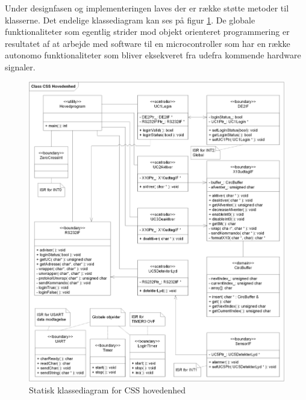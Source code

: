 Under designfasen og implementeringen laves der er række støtte metoder til klasserne. Det endelige klassediagram kan ses på  figur \ref{fig:CSS_hovedenhed_Class_Static}. De globale funktionaliteter som egentlig strider mod objekt orienteret programmering er resultatet af at arbejde med software til en microcontroller som har en række autonomo funktionaliteter som bliver eksekveret fra udefra kommende hardware signaler.

\begin{figure}[!htb] \centering
     \includegraphics[width=\textwidth]{billeder/uml/CSS_hovedenhed_Class_Static}
     \caption{Statisk klassediagram for CSS hovedenhed}
     \label{fig:CSS_hovedenhed_Class_Static}
\end{figure}